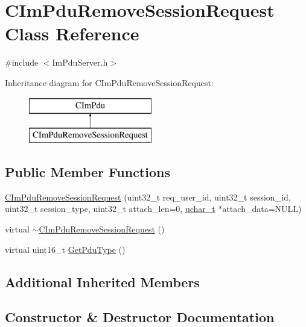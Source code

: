 \hypertarget{class_c_im_pdu_remove_session_request}{}\section{C\+Im\+Pdu\+Remove\+Session\+Request Class Reference}
\label{class_c_im_pdu_remove_session_request}


{\ttfamily \#include $<$Im\+Pdu\+Server.\+h$>$}

Inheritance diagram for C\+Im\+Pdu\+Remove\+Session\+Request\+:\begin{figure}[H]
\begin{center}
\leavevmode
\includegraphics[height=2.000000cm]{class_c_im_pdu_remove_session_request}
\end{center}
\end{figure}
\subsection*{Public Member Functions}
\begin{DoxyCompactItemize}
\item 
\hyperlink{class_c_im_pdu_remove_session_request_aa8896c7c39fe0e2740778d27c06d1d4b}{C\+Im\+Pdu\+Remove\+Session\+Request} (uint32\+\_\+t req\+\_\+user\+\_\+id, uint32\+\_\+t session\+\_\+id, uint32\+\_\+t session\+\_\+type, uint32\+\_\+t attach\+\_\+len=0, \hyperlink{base_2ostype_8h_a124ea0f8f4a23a0a286b5582137f0b8d}{uchar\+\_\+t} $\ast$attach\+\_\+data=N\+U\+L\+L)
\item 
virtual \hyperlink{class_c_im_pdu_remove_session_request_a4518242dcc178778d068526161f2d167}{$\sim$\+C\+Im\+Pdu\+Remove\+Session\+Request} ()
\item 
virtual uint16\+\_\+t \hyperlink{class_c_im_pdu_remove_session_request_a6d36ceff2000416ae27c527fbe6e9478}{Get\+Pdu\+Type} ()
\end{DoxyCompactItemize}
\subsection*{Additional Inherited Members}


\subsection{Constructor \& Destructor Documentation}
\hypertarget{class_c_im_pdu_remove_session_request_aa8896c7c39fe0e2740778d27c06d1d4b}{}
